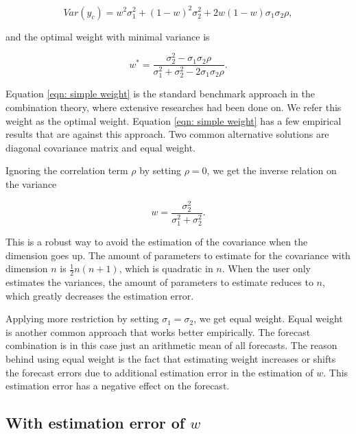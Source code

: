 \documentclass[11pt]{article}
\begin{document}
\begin{equation}
\label{eqn: var yc}
Var(y_c) = w^2\sigma_1^2+ (1-w)^2\sigma_2^2+2w(1-w)\sigma_1\sigma_2\rho,
\end{equation}

and the optimal weight with minimal variance is

\begin{equation}
\label{eqn: simple weight}
w^*=\frac{\sigma_2^2-\sigma_1\sigma_2\rho}{\sigma_1^2+\sigma_2^2 -2\sigma_1\sigma_2\rho}.
\end{equation}

Equation \ref{eqn: simple weight} is the standard benchmark approach in
the combination theory, where extensive researches had been done on. We refer this weight as the optimal weight. Equation \ref{eqn: simple weight} has a few
empirical results that are against this approach. Two common
alternative solutions are diagonal covariance matrix and equal weight.

Ignoring the correlation term \(\rho\) by setting \(\rho=0\), we get the
inverse relation on the variance

\begin{equation}
\label{eqn: simple weight no corr}
w=\frac{\sigma_2^2}{\sigma_1^2+\sigma_2^2}.
\end{equation}

This is a robust way to avoid the estimation of the covariance when the
dimension goes up. The amount of parameters to estimate for the
covariance with dimension \(n\) is \(\frac{1}{2}n(n+1)\), which is
quadratic in \(n\). When the user only estimates the variances, the
amount of parameters to estimate reduces to \(n\), which greatly
decreases the estimation error. \cite{Stock2001}

Applying more restriction by setting $\sigma_1=\sigma_2$, we get equal weight. Equal weight is another common approach that works better empirically.
\cite{Clemen1989} The forecast combination is in this case just an
arithmetic mean of all forecasts. The reason behind using equal weight is the fact
that estimating weight increases or shifts the forecast errors due to
additional estimation error in the estimation of \(w\). This estimation error has a negative effect on the forecast.


\subsection{\texorpdfstring{With estimation error of
\(w\)}{With estimation error of w}}\label{with-estimation-error-of-w}
\end{document}

